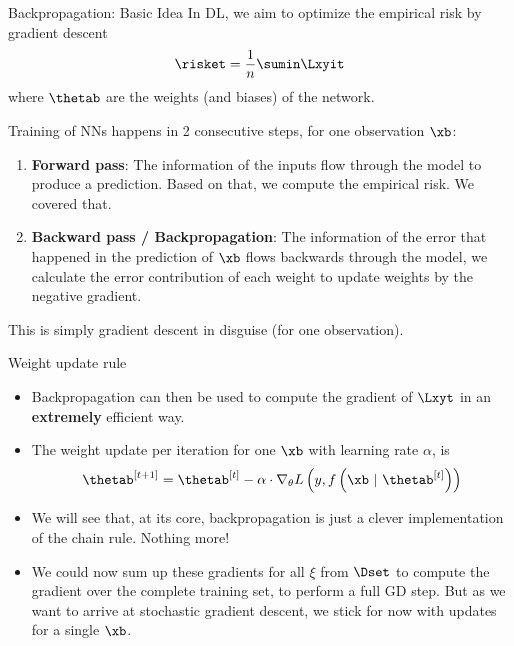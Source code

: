 







\begin{frame}{Backpropagation: Basic Idea}
In DL, we aim to optimize the empirical risk by gradient descent $$\risket = \frac{1}{n} \sumin \Lxyit$$ where $\thetab$ are the weights (and biases) of the network. 

Training of NNs happens in 2 consecutive steps, for one observation $\xb$:
\begin{enumerate}
\item \textbf{Forward pass}: The information of the inputs flow through the model to produce a prediction. Based on that, we compute the empirical risk. We covered that.
\item \textbf{Backward pass / Backpropagation}: The information of the error that happened in the prediction of $\xb$ flows backwards through the model, we calculate the error contribution of each weight to update weights by the negative gradient. 
\end{enumerate}
This is simply gradient descent in disguise (for one observation).
\end{frame}

\begin{vbframe}{Weight update rule}
  \begin{itemize}
    \item Backpropagation can then be used to compute the gradient of $\Lxyt$ in an \textbf{extremely} efficient way.
    \item The weight update per iteration for one $\xb$ with learning rate $\alpha$, is 
      $$\thetab^{[t+1]} = \thetab^{[t]} - \alpha \cdot \nabla_{\theta}L\left(y, f\left(\xb ~|~ \thetab^{[t]}\right)\right)$$ 
        \item We will see that, at its core, backpropagation is just a clever implementation of the chain rule. Nothing more!

  \item We could now sum up these gradients for all $\xi$ from $\Dset$ to compute the gradient over the complete training set, to perform a full GD step. But as we want to arrive at stochastic gradient descent, 
    we stick for now with updates for a single $\xb$.
  \end{itemize}
\end{vbframe}


